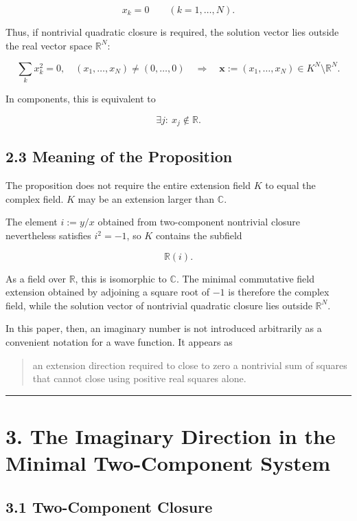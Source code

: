 \documentclass[
  a4paper,
  10pt]{article}
\begin{document}
\[
x_k=0
\qquad(k=1,\ldots,N).
\]

Thus, if nontrivial quadratic closure is required, the solution vector
lies outside the real vector space \(\mathbb R^N\):

\[
\boxed{
\sum_kx_k^2=0,
\quad
(x_1,\ldots,x_N)\neq(0,\ldots,0)
\quad\Longrightarrow\quad
\mathbf{x}:=(x_1,\ldots,x_N)\in K^N\setminus\mathbb R^N
}.
\]

In components, this is equivalent to

\[
\boxed{
\exists j:\ x_j\notin\mathbb R
}.
\]

\subsection{2.3 Meaning of the
Proposition}\label{23-meaning-of-the-proposition}

The proposition does not require the entire extension field \(K\) to
equal the complex field. \(K\) may be an extension larger than
\(\mathbb C\).

The element \(i:=y/x\) obtained from two-component nontrivial closure
nevertheless satisfies \(i^2=-1\), so \(K\) contains the subfield

\[
\mathbb R(i).
\]

As a field over \(\mathbb R\), this is isomorphic to \(\mathbb C\). The
minimal commutative field extension obtained by adjoining a square root
of \(-1\) is therefore the complex field, while the solution vector of
nontrivial quadratic closure lies outside \(\mathbb R^N\).

In this paper, then, an imaginary number is not introduced arbitrarily
as a convenient notation for a wave function. It appears as

\begin{quote}
an extension direction required to close to zero a nontrivial sum of
squares that cannot close using positive real squares alone.
\end{quote}

\begin{center}\rule{0.5\linewidth}{0.5pt}\end{center}

\section{3. The Imaginary Direction in the Minimal Two-Component
System}\label{3-the-imaginary-direction-in-the-minimal-two-component-system}

\subsection{3.1 Two-Component Closure}\label{31-two-component-closure}
\end{document}
